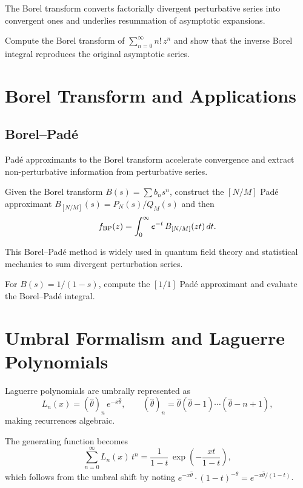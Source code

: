 The Borel transform converts factorially divergent perturbative series
into convergent ones and underlies resummation of asymptotic expansions.

\begin{exercise}
Compute the Borel transform of $\sum_{n=0}^\infty n!\,z^n$ and show that
the inverse Borel integral reproduces the original asymptotic series.
\end{exercise}

\section{Borel Transform and Applications}

\subsection{Borel--Pad\'e}

Pad\'e approximants to the Borel transform accelerate convergence and
extract non-perturbative information from perturbative series.

Given the Borel transform $B(s)=\sum b_n s^n$, construct the
$[N/M]$ Pad\'e approximant $B_{[N/M]}(s)=P_N(s)/Q_M(s)$ and then
\begin{equation}
f_{\rm BP}(z) = \int_0^\infty e^{-t}\,B_{[N/M]}(zt)\,dt.
\label{eq:9.3.1}
\end{equation}

This Borel--Pad\'e method is widely used in quantum field theory and
statistical mechanics to sum divergent perturbation series.

\begin{exercise}
For $B(s)=1/(1-s)$, compute the $[1/1]$ Pad\'e approximant and
evaluate the Borel--Pad\'e integral.
\end{exercise}

\section{Umbral Formalism and Laguerre Polynomials}

Laguerre polynomials are umbrally represented as
\begin{equation}
L_n(x) = (\hat\theta)_n\,e^{-x\hat\theta},
\qquad (\hat\theta)_n = \hat\theta(\hat\theta-1)\cdots(\hat\theta-n+1),
\label{eq:9.4.1}
\end{equation}
making recurrences algebraic.

The generating function becomes
\begin{equation}
\sum_{n=0}^\infty L_n(x)\,t^n
= \frac{1}{1-t}\,\exp\!\left(-\frac{xt}{1-t}\right),
\label{eq:9.4.2}
\end{equation}
which follows from the umbral shift by noting
$e^{-x\hat\theta}\cdot(1-t)^{-\hat\theta}=e^{-x\hat\theta/(1-t)}$.

